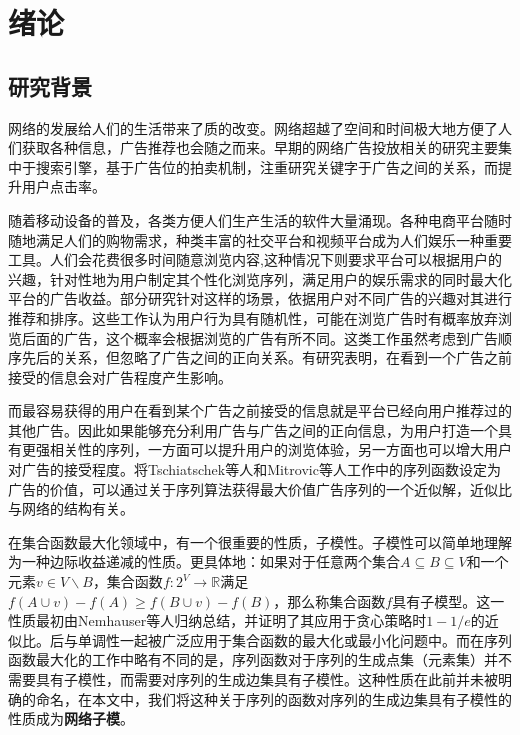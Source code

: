 \chapter{绪论}

\section{研究背景}

网络的发展给人们的生活带来了质的改变。网络超越了空间和时间极大地方便了人们获取各种信息，广告推荐也会随之而来。早期的网络广告投放相关的研究主要集中于搜索引擎，基于广告位的拍卖机制，注重研究关键字于广告之间的关系，而提升用户点击率\cite{edelman2007internet,attenberg2009modeling}。

随着移动设备的普及，各类方便人们生产生活的软件大量涌现。各种电商平台随时随地满足人们的购物需求，种类丰富的社交平台和视频平台成为人们娱乐一种重要工具。人们会花费很多时间随意浏览内容,这种情况下则要求平台可以根据用户的兴趣，针对性地为用户制定其个性化浏览序列，满足用户的娱乐需求的同时最大化平台的广告收益。部分研究\cite{kempe2008cascade,craswell2008experimental,tang2017robust}针对这样的场景，依据用户对不同广告的兴趣对其进行推荐和排序。这些工作认为用户行为具有随机性，可能在浏览广告时有概率放弃浏览后面的广告，这个概率会根据浏览的广告有所不同。这类工作虽然考虑到广告顺序先后的关系，但忽略了广告之间的正向关系。有研究表明，在看到一个广告之前接受的信息会对广告程度产生影响\cite{loda2005sequence}。

而最容易获得的用户在看到某个广告之前接受的信息就是平台已经向用户推荐过的其他广告。因此如果能够充分利用广告与广告之间的正向信息，为用户打造一个具有更强相关性的序列，一方面可以提升用户的浏览体验，另一方面也可以增大用户对广告的接受程度。将Tschiatschek等人\cite{tschiatschek2017selecting}和Mitrovic等人\cite{mitrovic2018submodularity}工作中的序列函数设定为广告的价值，可以通过关于序列算法获得最大价值广告序列的一个近似解，近似比与网络的结构有关。

在集合函数最大化领域中，有一个很重要的性质，子模性。子模性可以简单地理解为一种边际收益递减的性质。更具体地：如果对于任意两个集合$A\subseteq B \subseteq V$和一个元素$v\in V\backslash B$，集合函数$f: 2^V \to \mathbb{R}$满足$f(A\cup v) - f(A) \ge f(B\cup v) -f(B)$，那么称集合函数$f$具有子模型。这一性质最初由Nemhauser\cite{nemhauser1978analysis}等人归纳总结，并证明了其应用于贪心策略时$1-1/e$的近似比。后与单调性一起被广泛应用于集合函数的最大化或最小化问题中\cite{nemhauser1978best,khuller1999budgeted}。而在序列函数最大化的工作中\cite{tschiatschek2017selecting,mitrovic2018submodularity}略有不同的是，序列函数对于序列的生成点集（元素集）并不需要具有子模性，而需要对序列的生成边集具有子模性。这种性质在此前并未被明确的命名，在本文中，我们将这种关于序列的函数对序列的生成边集具有子模性的性质成为\textbf{网络子模}。 

